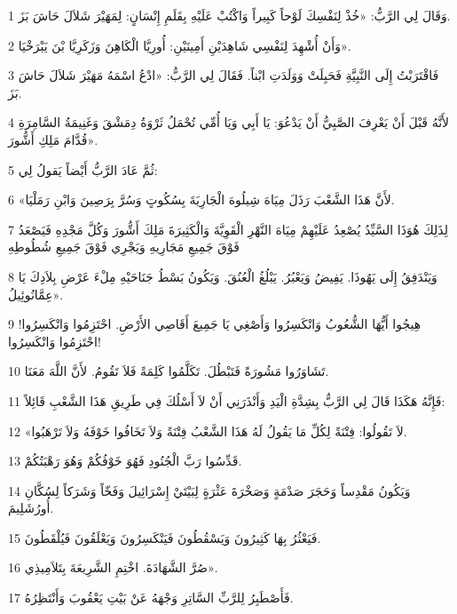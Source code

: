 \par 1 وَقَالَ لِي الرَّبُّ: «خُذْ لِنَفْسِكَ لَوْحاً كَبِيراً وَاكْتُبْ عَلَيْهِ بِقَلَمِ إِنْسَانٍ: لِمَهَيْرَ شَلاَلَ حَاشَ بَزَ.
\par 2 وَأَنْ أُشْهِدَ لِنَفْسِي شَاهِدَيْنِ أَمِينَيْنِ: أُورِيَّا الْكَاهِنَ وَزَكَرِيَّا بْنَ يَبْرَخْيَا».
\par 3 فَاقْتَرَبْتُ إِلَى النَّبِيَّةِ فَحَبِلَتْ وَوَلَدَتِ ابْناً. فَقَالَ لِي الرَّبُّ: «ادْعُ اسْمَهُ مَهَيْرَ شَلاَلَ حَاشَ بَزَ.
\par 4 لأَنَّهُ قَبْلَ أَنْ يَعْرِفَ الصَّبِيُّ أَنْ يَدْعُوَ: يَا أَبِي وَيَا أُمِّي تُحْمَلُ ثَرْوَةُ دِمَشْقَ وَغَنِيمَةُ السَّامِرَةِ قُدَّامَ مَلِكِ أَشُّورَ».
\par 5 ثُمَّ عَادَ الرَّبُّ أَيْضاً يَقولُ لِي:
\par 6 «لأَنَّ هَذَا الشَّعْبَ رَذَلَ مِيَاهَ شِيلُوهَ الْجَارِيَةَ بِسُكُوتٍ وَسُرَّ بِرَصِينَ وَابْنِ رَمَلْيَا.
\par 7 لِذَلِكَ هُوَذَا السَّيِّدُ يُصْعِدُ عَلَيْهِمْ مِيَاهَ النَّهْرِ الْقَوِيَّةَ وَالْكَثِيرَةَ مَلِكَ أَشُّورَ وَكُلَّ مَجْدِهِ فَيَصْعَدُ فَوْقَ جَمِيعِ مَجَارِيهِ وَيَجْرِي فَوْقَ جَمِيعِ شُطُوطِهِ
\par 8 وَيَنْدَفِقُ إِلَى يَهُوذَا. يَفِيضُ وَيَعْبُرُ. يَبْلُغُ الْعُنُقَ. وَيَكُونُ بَسْطُ جَنَاحَيْهِ مِلْءَ عَرْضِ بِلاَدِكَ يَا عِمَّانُوئِيلُ».
\par 9 هِيجُوا أَيُّهَا الشُّعُوبُ وَانْكَسِرُوا وَأَصْغِي يَا جَمِيعَ أَقَاصِي الأَرْضِ. احْتَزِمُوا وَانْكَسِرُوا! احْتَزِمُوا وَانْكَسِرُوا!
\par 10 تَشَاوَرُوا مَشُورَةً فَتَبْطُلَ. تَكَلَّمُوا كَلِمَةً فَلاَ تَقُومُ. لأَنَّ اللَّهَ مَعَنَا.
\par 11 فَإِنَّهُ هَكَذَا قَالَ لِي الرَّبُّ بِشِدَّةِ الْيَدِ وَأَنْذَرَنِي أَنْ لاَ أَسْلُكَ فِي طَرِيقِ هَذَا الشَّعْبِ قَائِلاً:
\par 12 «لاَ تَقُولُوا: فِتْنَةً لِكُلِّ مَا يَقُولُ لَهُ هَذَا الشَّعْبُ فِتْنَةً وَلاَ تَخَافُوا خَوْفَهُ وَلاَ تَرْهَبُوا.
\par 13 قَدِّسُوا رَبَّ الْجُنُودِ فَهُوَ خَوْفُكُمْ وَهُوَ رَهْبَتُكُمْ.
\par 14 وَيَكُونُ مَقْدِساً وَحَجَرَ صَدْمَةٍ وَصَخْرَةَ عَثْرَةٍ لِبَيْتَيْ إِسْرَائِيلَ وَفَخّاً وَشَرَكاً لِسُكَّانِ أُورُشَلِيمَ.
\par 15 فَيَعْثُرُ بِهَا كَثِيرُونَ وَيَسْقُطُونَ فَيَنْكَسِرُونَ وَيَعْلَقُونَ فَيُلْقَطُونَ.
\par 16 صُرَّ الشَّهَادَةَ. اخْتِمِ الشَّرِيعَةَ بِتَلاَمِيذِي».
\par 17 فَأَصْطَبِرُ لِلرَّبِّ السَّاتِرِ وَجْهَهُ عَنْ بَيْتِ يَعْقُوبَ وَأَنْتَظِرُهُ.
